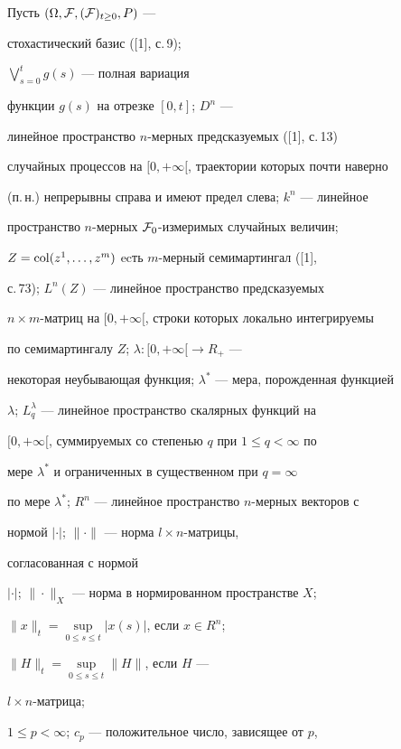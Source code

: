 \label{begin}





Пусть $(\Omega, {\cal F}, ({\cal F})_{t\ge 0}, P)$ --- 


стохастический базис ([1], с.\,9);


$\bigvee \limits_{s=0}^tg(s)$ --- полная вариация 


функции $g(s)$ на отрезке $[0, t]$; $D^n$ --- 


линейное пространство $n$-мерных предсказуемых ([1], с.\,13)


случайных процессов на $[0, +\infty [$, траектории которых почти наверно 


(п.\,н.) непрерывны справа и имеют предел слева; $k^n$ --- линейное 


пространство $n$-мерных ${\cal F}_0$-измеримых случайных величин;


$Z = \operatorname{col} (z^1,\dotsc, z^m)$ ecть $m$-мерный семимартингал ([1],


с.\,73); $L^n(Z)$ --- линейное пространство предсказуемых 


$n\times m$-матриц на $[0, +\infty [$, строки которых локально интегрируемы 


по семимартингалу $Z$; $\lambda :[0, +\infty [ \rightarrow R_+$ --- 


некоторая неубывающая функция; $\lambda ^*$ --- мера, порожденная функцией 


$\lambda$; $L^\lambda_q$ --- линейное пространство скалярных функций на 


$[0, +\infty [$, суммируемых со степенью $q$ при $1 \le q < \infty $ по 


мере $\lambda^*$ и ограниченных в существенном при $q = \infty$ 


по мере $\lambda^*$; $R^n$ --- линейное пространство $n$-мерных векторов с 


нормой $|\cdot|$; $\|\cdot\|$ --- норма $l\times n$-матрицы,


согласованная с нормой 


$|\cdot|$; $\|\cdot\|_X$ --- норма в нормированном пространстве $X$;


$\|x\|_t = \sup \limits_{0 \le s \le t}|x(s)|$, если $x \in R^n$;


$\|H\|_t = \sup \limits_{0 \le s \le t}\|H\|$, если $H$ --- 


$l\times n$-матрица;


$1 \le p < \infty $; $c_p$ --- положительное число, зависящее от $p$,


